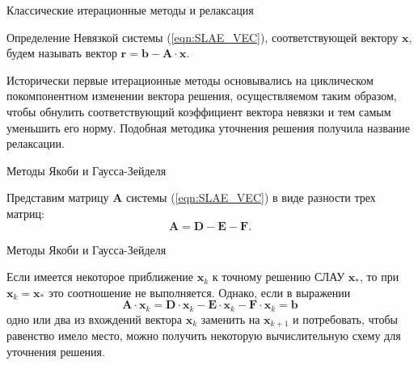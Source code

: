 \documentclass[10pt,xcolor=pst,aspectratio=169]{beamer}
\begin{document}
\begin{frame}{Классические итерационные методы и релаксация}

	\transdissolve[duration=0.2]
	\justifying
	\large
	\begin{block}{Определение}
		Невязкой системы (\ref{eqn:SLAE_VEC}), соответствующей вектору $\textbf{x}$, будем называть вектор $\textbf{r} = \textbf{b} - \textbf{A} \cdot \textbf{x}$.
	\end{block}
	Исторически первые итерационные методы основывались на циклическом покомпонентном изменении вектора решения, осуществляемом таким образом, чтобы обнулить соответствующий коэффициент вектора невязки и тем самым уменьшить его норму. Подобная методика уточнения решения получила название релаксации.

\end{frame}

\begin{frame}{Методы Якоби и Гаусса-Зейделя}

	\transdissolve[duration=0.2]
	\justifying
	\large
	Представим матрицу $\textbf{A}$ системы (\ref{eqn:SLAE_VEC}) в виде разности трех матриц:
	\[
		\textbf{A} = \textbf{D} - \textbf{E} - \textbf{F}.
	\]
	\begin{figure}[h]
	\end{figure}

\end{frame}

\begin{frame}{Методы Якоби и Гаусса-Зейделя}

	\transdissolve[duration=0.2]
	\justifying
	\large
	Если имеется некоторое приближение $\textbf{x}_{k}$ к точному решению СЛАУ $\textbf{x}_{\ast}$, то при $\textbf{x}_{k} = \textbf{x}_{\ast}$ это соотношение не выполняется. Однако,
если в выражении
	\begin{equation}
		\textbf{A} \cdot \textbf{x}_{k} = \textbf{D} \cdot \textbf{x}_{k} - \textbf{E} \cdot \textbf{x}_{k} - \textbf{F} \cdot \textbf{x}_{k} = \textbf{b}
		\label{eqn:SIMPLE_ITER}
	\end{equation}
	одно или два из вхождений вектора $\textbf{x}_{k}$ заменить на $\textbf{x}_{k+1}$ и потребовать, чтобы равенство имело место, можно получить некоторую вычислительную схему для уточнения решения.

\end{frame}
\end{document}
